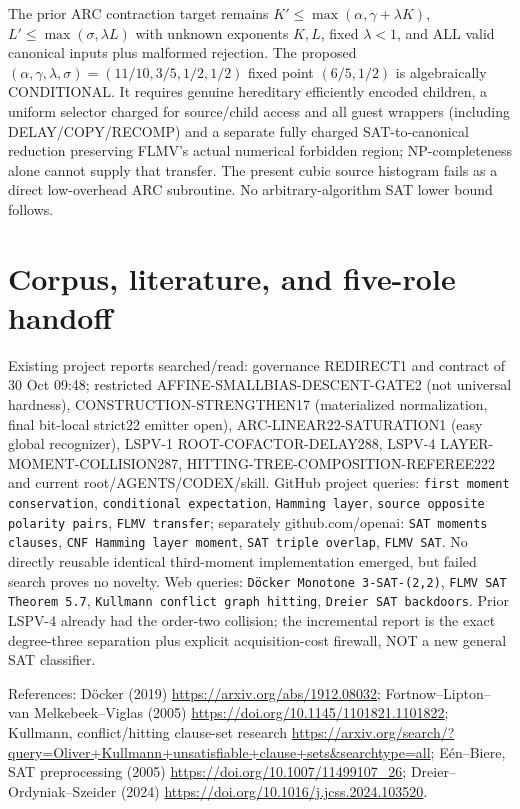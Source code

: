 \documentclass[10pt]{article}
\begin{document}
The prior ARC contraction target remains $K'\le\max(\alpha,\gamma+\lambda K)$, $L'\le\max(\sigma,\lambda L)$ with unknown exponents $K,L$, fixed $\lambda<1$, and ALL valid canonical inputs plus malformed rejection. The proposed $(\alpha,\gamma,\lambda,\sigma)=(11/10,3/5,1/2,1/2)$ fixed point $(6/5,1/2)$ is algebraically CONDITIONAL. It requires genuine hereditary efficiently encoded children, a uniform selector charged for source/child access and all guest wrappers (including DELAY/COPY/RECOMP) and a separate fully charged SAT-to-canonical reduction preserving FLMV's actual numerical forbidden region; NP-completeness alone cannot supply that transfer. The present cubic source histogram fails as a direct low-overhead ARC subroutine. No arbitrary-algorithm SAT lower bound follows.

\section{Corpus, literature, and five-role handoff}
Existing project reports searched/read: governance REDIRECT1 and contract of 30 Oct 09:48; restricted AFFINE-SMALLBIAS-DESCENT-GATE2 (not universal hardness), CONSTRUCTION-STRENGTHEN17 (materialized normalization, final bit-local strict22 emitter open), ARC-LINEAR22-SATURATION1 (easy global recognizer), LSPV-1 ROOT-COFACTOR-DELAY288, LSPV-4 LAYER-MOMENT-COLLISION287, HITTING-TREE-COMPOSITION-REFEREE222 and current root/AGENTS/CODEX/skill. GitHub project queries: \texttt{first moment conservation}, \texttt{conditional expectation}, \texttt{Hamming layer}, \texttt{source opposite polarity pairs}, \texttt{FLMV transfer}; separately github.com/openai: \texttt{SAT moments clauses}, \texttt{CNF Hamming layer moment}, \texttt{SAT triple overlap}, \texttt{FLMV SAT}. No directly reusable identical third-moment implementation emerged, but failed search proves no novelty. Web queries: \texttt{D\"ocker Monotone 3-SAT-(2,2)}, \texttt{FLMV SAT Theorem 5.7}, \texttt{Kullmann conflict graph hitting}, \texttt{Dreier SAT backdoors}. Prior LSPV-4 already had the order-two collision; the incremental report is the exact degree-three separation plus explicit acquisition-cost firewall, NOT a new general SAT classifier.

References: D\"ocker (2019) \url{https://arxiv.org/abs/1912.08032}; Fortnow--Lipton--van Melkebeek--Viglas (2005) \url{https://doi.org/10.1145/1101821.1101822}; Kullmann, conflict/hitting clause-set research \url{https://arxiv.org/search/?query=Oliver+Kullmann+unsatisfiable+clause+sets&searchtype=all}; E\'en--Biere, SAT preprocessing (2005) \url{https://doi.org/10.1007/11499107_26}; Dreier--Ordyniak--Szeider (2024) \url{https://doi.org/10.1016/j.jcss.2024.103520}.
\end{document}

